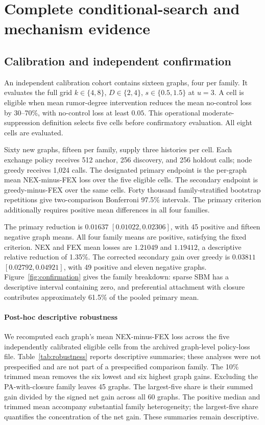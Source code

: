 \documentclass[preprint,11pt,sort&compress]{elsarticle}
\begin{document}
\FloatBarrier\section{Complete conditional-search and mechanism evidence}
\subsection{Calibration and independent confirmation}\label{sec:conditional_details}
An independent calibration cohort contains sixteen graphs, four per family. It evaluates the full grid $k\in\{4,8\}$, $D\in\{2,4\}$, $s\in\{0.5,1.5\}$ at $u=3$. A cell is eligible when mean rumor-degree intervention reduces the mean no-control loss by 30--70\%, with no-control loss at least $0.05$. This operational moderate-suppression definition selects five cells before confirmatory evaluation. All eight cells are evaluated.

Sixty new graphs, fifteen per family, supply three histories per cell. Each exchange policy receives 512 anchor, 256 discovery, and 256 holdout calls; node greedy receives 1,024 calls. The designated primary endpoint is the per-graph mean NEX-minus-FEX loss over the five eligible cells. The secondary endpoint is greedy-minus-FEX over the same cells. Forty thousand family-stratified bootstrap repetitions give two-comparison Bonferroni 97.5\% intervals. The primary criterion additionally requires positive mean differences in all four families.

The primary reduction is $0.01637$ $[0.01022,0.02306]$, with 45 positive and fifteen negative graph means. All four family means are positive, satisfying the fixed criterion. NEX and FEX mean losses are $1.21049$ and $1.19412$, a descriptive relative reduction of 1.35\%. The corrected secondary gain over greedy is $0.03811$ $[0.02792,0.04921]$, with 49 positive and eleven negative graphs. Figure~\ref{fig:confirmation} gives the family breakdown: sparse SBM has a descriptive interval containing zero, and preferential attachment with closure contributes approximately 61.5\% of the pooled primary mean.

\paragraph{Post-hoc descriptive robustness} We recomputed each graph's mean NEX-minus-FEX loss across the five independently calibrated eligible cells from the archived graph-level policy-loss file. Table~\ref{tab:robustness} reports descriptive summaries; these analyses were not prespecified and are not part of a prespecified comparison family. The 10\% trimmed mean removes the six lowest and six highest graph gains. Excluding the PA-with-closure family leaves 45 graphs. The largest-five share is their summed gain divided by the signed net gain across all 60 graphs. The positive median and trimmed mean accompany substantial family heterogeneity; the largest-five share quantifies the concentration of the net gain. These summaries remain descriptive.
\end{document}
